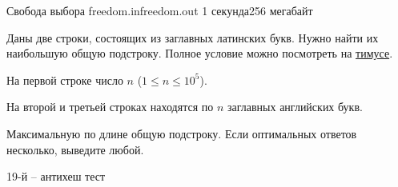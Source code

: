 
\begin{problem}{Свобода выбора}
{freedom.in}{freedom.out}
{1 секунда}{256 мегабайт}{}

Даны две строки, состоящих из заглавных латинских букв.
Нужно найти их наибольшую общую подстроку.
Полное условие можно посмотреть на \href{http://acm.timus.ru/problem.aspx?space=1\&num=1517\&locale=ru}{тимусе}.

\InputFile

На первой строке число $n$ ($1 \le n \le 10^5$).

На второй и третьей строках находятся по $n$ заглавных английских букв.

\OutputFile

Максимальную по длине общую подстроку.
Если оптимальных ответов несколько, выведите любой.

\Examples

\begin{example}
%
\end{example}

\end{problem}

\Note

19-й -- антихеш тест
